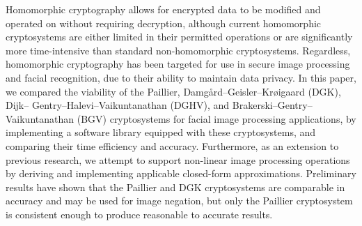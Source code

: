 \begin{thesisabstract}
    \noindent
    Homomorphic cryptography allows for encrypted data to be modified and operated on without requiring decryption, although current homomorphic cryptosystems are either limited in their permitted operations or are significantly more time-intensive than standard non-homomorphic cryptosystems. Regardless, homomorphic cryptography has been targeted for use in secure image processing and facial recognition, due to their ability to maintain data privacy. In this paper, we compared the viability of the Paillier, Damg{\aa}rd--Geisler--Kr{\o}igaard (DGK), Dijk-- Gentry--Halevi--Vaikuntanathan (DGHV), and Brakerski--Gentry--Vaikuntanathan (BGV) cryptosystems for facial image processing applications, by implementing a software library equipped with these cryptosystems, and comparing their time efficiency and accuracy. Furthermore, as an extension to previous research, we attempt to support non-linear image processing operations by deriving and implementing applicable closed-form approximations. Preliminary results have shown that the Paillier and DGK cryptosystems are comparable in accuracy and may be used for image negation, but only the Paillier cryptosystem is consistent enough to produce reasonable to accurate results.

\end{thesisabstract}
